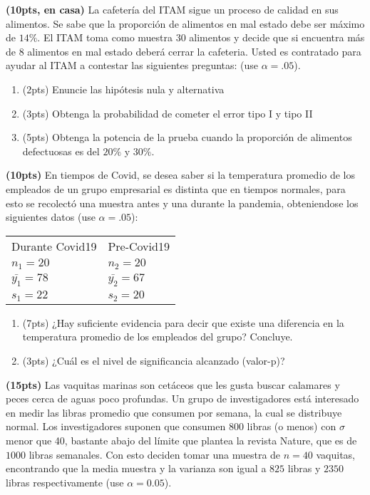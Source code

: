 \documentclass[addpoints]{exam}
\theoremstyle{mytheor}
\begin{document}
  
\begin{questions} 

\question \textbf{(10pts, en casa)}  La cafetería del ITAM sigue un proceso de calidad en sus alimentos. Se sabe que la proporción de alimentos en mal estado debe ser máximo de $14\%$. El ITAM toma como muestra 30 alimentos y decide que si encuentra más de 8 alimentos en mal estado deberá cerrar la cafeteria. Usted es contratado para ayudar al ITAM a contestar las siguientes preguntas: (use $\alpha = .05$). 
  
\begin{enumerate}[label=\Alph*)]
\item (2pts) Enuncie las hipótesis nula y alternativa
\item (3pts) Obtenga la probabilidad de cometer el error tipo I y tipo II
\item (5pts) Obtenga la potencia de la prueba cuando la proporción de alimentos defectuosas es del $20\%$ y $30\%$. 
\end{enumerate}
 
 
   \question \textbf{(10pts)} En tiempos de Covid, se desea saber si la temperatura promedio de los empleados de un grupo empresarial es distinta que en tiempos normales, para esto se recolectó una muestra antes y una durante la pandemia, obteniendose los siguientes datos (use $\alpha = .05$):

    \begin{table}[h]
    \centering
    \begin{tabular}{ll}
    Durante Covid19 & Pre-Covid19 \\
    $n_1 = 20$ & $n_2 = 20$ \\
    $\bar{y_1} =  78$ & $\bar{y_2} = 67$ \\
    $s_1 = 22$ &  $s_2 = 20$
    \end{tabular}
    \end{table}

\begin{enumerate}[label=\Alph*)]
  \item (7pts) ¿Hay suficiente evidencia para decir que existe una diferencia en la temperatura promedio de los empleados del grupo? Concluye.
  \item (3pts) ¿Cuál es el nivel de significancia alcanzado (valor-p)?
  \end{enumerate}
  
  
 \question \textbf{(15pts)} Las vaquitas marinas son cetáceos que les gusta buscar calamares y peces cerca de aguas poco profundas. Un grupo de investigadores está interesado en medir las libras promedio que consumen por semana, la cual se distribuye normal. Los investigadores suponen que consumen $800$ libras (o menos) con $\sigma$ menor que 40, bastante abajo del límite que plantea la revista Nature, que es de $1000$ libras semanales. Con esto deciden tomar una muestra de $n = 40$ vaquitas, encontrando que la media muestra y la varianza son igual a $825$ libras y $2350$ libras respectivamente (use $\alpha = 0.05$).
  

\end{questions}
\end{document}
